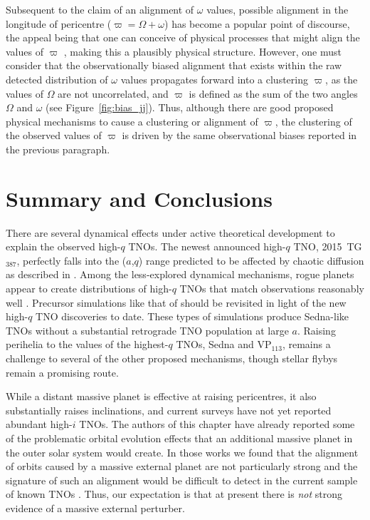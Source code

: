 \documentclass[preprint]{aastex62}
\begin{document}
Subsequent to the claim of an alignment of $\omega$ values, possible
alignment in the longitude of pericentre ($\varpi=\Omega+\omega$) has become
a popular point of discourse,  the appeal being that one can conceive
of physical processes that might align the values of $\varpi$ \citep[e.g.][]{batyginbrown16},
making this a plausibly physical structure.  However, one must
consider that the observationally biased alignment that exists within the raw detected distribution of $\omega$ values propagates forward into a clustering $\varpi$, as the values of $\Omega$ are not uncorrelated, and $\varpi$ is defined as the sum of the two angles $\Omega$ and $\omega$ (see Figure~\ref{fig:bias_jj}).  Thus, although there
are good proposed physical mechanisms to cause a clustering or alignment of
$\varpi$, the clustering of the observed values of
$\varpi$ is driven by the same observational biases reported
in the previous paragraph.


\section{Summary and Conclusions} 

There are several dynamical effects under active theoretical development to explain the observed high-$q$ TNOs. 
The newest announced high-$q$ TNO, 2015~TG$_{387}$, perfectly falls into the ($a$,$q$) range predicted to be affected by chaotic diffusion as described in \citet{bannister17}.
Among the less-explored dynamical mechanisms, rogue planets appear to create distributions of high-$q$ TNOs that match observations reasonably well \citep{lawler2018,silsbee18}.
Precursor simulations like that of \citet{gladmanchan06} should be revisited in light of
the new high-$q$ TNO discoveries to date.  
These types of simulations produce Sedna-like TNOs without a substantial retrograde TNO population at large $a$.
Raising perihelia to the values of the highest-$q$ TNOs, Sedna and VP$_{113}$, remains a challenge to several of the other proposed mechanisms, though stellar flybys remain a promising route.  

While a distant massive planet is effective
at raising pericentres, it also substantially raises inclinations, and current surveys have not yet reported abundant high-$i$ TNOs. 
The authors of this chapter have already reported some of the problematic orbital evolution effects that an additional massive planet in the outer solar system would create.  In those works we found that the alignment of orbits caused by a massive external planet are not particularly strong \citep{shankman17bias}  and the signature of such an alignment would be difficult to detect in the current sample of known TNOs \citep{lawler2017}.  
Thus, our expectation is that at present there is {\em not} strong evidence of a massive external perturber.
\end{document}
